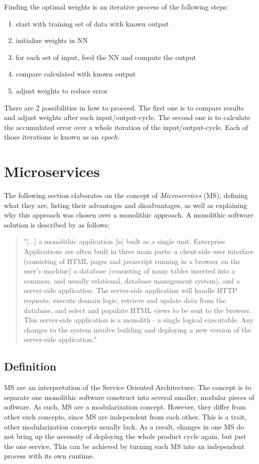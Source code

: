Finding the optimal weights is an iterative process of the following steps:
\begin{enumerate}
	\item start with training set of data with known output
	\item initialize weights in NN
	\item for each set of input, feed the NN and compute the output
	\item compare calculated with known output
	\item adjust weights to reduce error
\end{enumerate}

There are 2 possibilities in how to proceed. The first one is to compare results and adjust weights after each input/output-cycle. The second one is to calculate the accumulated error over a whole iteration of the input/output-cycle. Each of those iterations is known as an \emph{epoch}\cite{Bourg04}.


\section{Microservices}
The following section elaborates on the concept of \emph{Microservices} (MS), defining what they are, listing their advantages and disadvantages, as well as explaining why this approach was chosen over a monolithic approach. A monolithic software solution is described by \cite{Lewis14} as follows:
\begin{quotation}
	"[...] a monolithic application [is] built as a single unit. Enterprise Applications are often built in three main parts: a client-side user interface (consisting of HTML pages and javascript running in a browser on the user's machine) a database (consisting of many tables inserted into a common, and usually relational, database management system), and a server-side application. The server-side application will handle HTTP requests, execute domain logic, retrieve and update data from the database, and select and populate HTML views to be sent to the browser. This server-side application is a monolith - a single logical executable. Any changes to the system involve building and deploying a new version of the server-side application."
\end{quotation}


\subsection{Definition}
\label{sec2_msDef}
MS are an interpretation of the Service Oriented Architecture. The concept is to separate one monolithic software construct into several smaller, modular pieces of software\cite{Wolff16}. As such, MS are a modularization concept. However, they differ from other such concepts, since MS are independent from each other. This is a trait, other modularization concepts usually lack\cite{Wolff16}. As a result, changes in one MS do not bring up the necessity of deploying the whole product cycle again, but just the one service. This can be achieved by turning each MS into an independent process with its own runtime\cite{Lewis14}.

